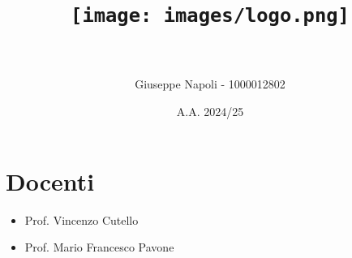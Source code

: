 \documentclass[12pt]{article}
\title{
  \texttt{[image: images/logo.png]}\\
  \vspace{1cm}
  \materia\\
  \projectName
}
\author{Giuseppe Napoli - 1000012802}
\date{A.A. 2024/25}
\newcommand{\docenteUno}{Prof. Vincenzo Cutello}
\newcommand{\docenteDue}{Prof. Mario Francesco Pavone}
\begin{document}
\maketitle

\section*{Docenti}
\begin{itemize}
  \item \docenteUno
  \item \docenteDue
\end{itemize}

\newpage
\tableofcontents
\newpage

\newpage


\newpage

\newpage

\end{document}
